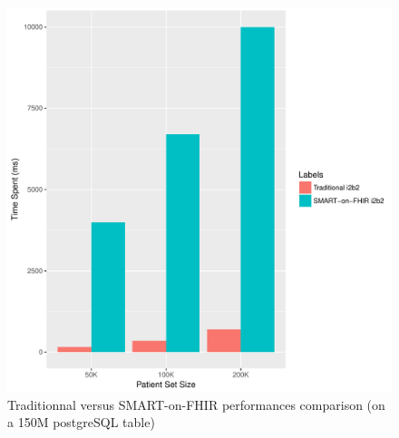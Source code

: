 \documentclass{amia}
\begin{document}
\begin{figure}[h]
\centering
\includegraphics[scale=.7]{graph2.pdf}
	\caption{Traditionnal versus SMART-on-FHIR performances comparison (on a 150M postgreSQL table)}
\label{fig1}
\end{figure}
\end{document}
